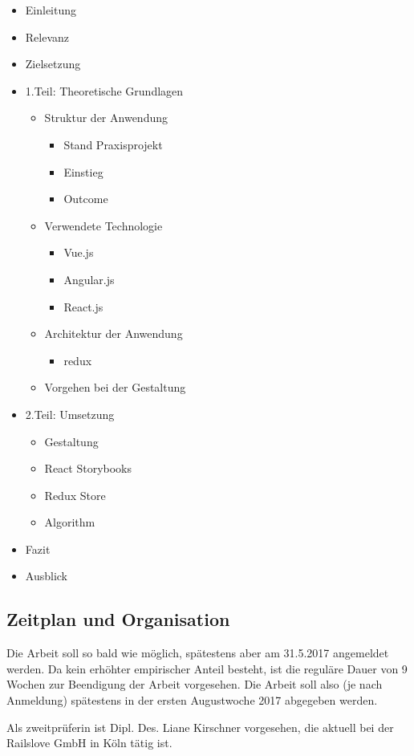 \begin{itemize}
  \item Einleitung
  \item Relevanz
  \item Zielsetzung
  \item 1.Teil: Theoretische Grundlagen
  \begin{itemize}
    \item Struktur der Anwendung
    \begin{itemize}
      \item Stand Praxisprojekt
      \item Einstieg
      \item Outcome
    \end{itemize}
    \item Verwendete Technologie
    \begin{itemize}
      \item Vue.js
      \item Angular.js
      \item React.js
    \end{itemize}
    \item Architektur der Anwendung
    \begin{itemize}
      \item redux
    \end{itemize}
    \item Vorgehen bei der Gestaltung
  \end{itemize}
  \item 2.Teil: Umsetzung
  \begin{itemize}
    \item Gestaltung
    \item React Storybooks
    \item Redux Store
    \item Algorithm
  \end{itemize}
  \item Fazit
  \item Ausblick
\end{itemize}

\subsection{Zeitplan und Organisation}
Die Arbeit soll so bald wie möglich, spätestens aber am 31.5.2017 angemeldet werden. Da kein erhöhter empirischer Anteil besteht, ist die reguläre Dauer von 9 Wochen zur Beendigung der Arbeit vorgesehen. Die Arbeit soll also (je nach Anmeldung) spätestens in der ersten Augustwoche 2017 abgegeben werden.

Als zweitprüferin ist Dipl. Des. Liane Kirschner vorgesehen, die aktuell bei der Railslove GmbH in Köln tätig ist.
